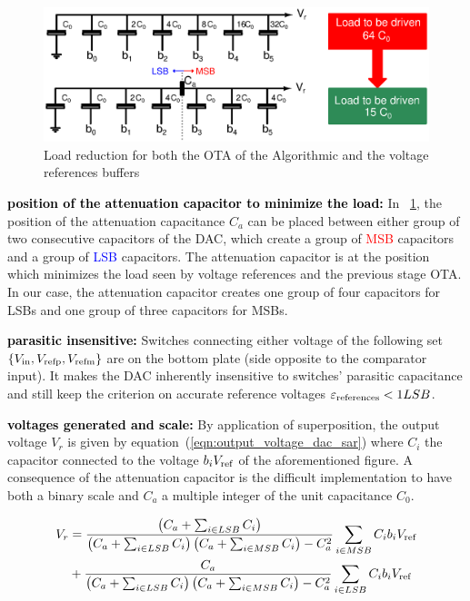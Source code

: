 \begin{figure}[htp]
	\centering
	\includegraphics[width=\textwidth]{Chapter4/Figs/sar-dac-normal-split-cap.ps}
	\caption{Load reduction for both the OTA of the Algorithmic and the voltage references buffers}
	\label{fig:sar-dac-normal-split-cap}
\end{figure}
\textbf{\textcolor{black}{position of the attenuation capacitor to minimize the load:}}
In \figurename~\ref{fig:sar-dac-normal-split-cap}, the position of the attenuation capacitance \(C_a\) can be placed between either group of two consecutive capacitors of the DAC, which create a group of \textcolor{red}{MSB} capacitors and a group of \textcolor{blue}{LSB} capacitors. The attenuation capacitor is at the position which minimizes the load seen by voltage references and the previous stage OTA\@. In our case, the attenuation capacitor creates one group of four capacitors for LSBs and one group of three capacitors for MSBs.

\textbf{\textcolor{black}{parasitic insensitive:}}
Switches connecting either voltage of the following set \(\left\{ V_{\rm in}, V_{\rm refp}, V_{\rm refm} \right\} \) are on the bottom plate (side opposite to the comparator input). It makes the DAC inherently insensitive to switches' parasitic capacitance and still keep the criterion on accurate reference voltages \(\varepsilon_{\rm references} < 1 LSB\).

\textbf{\textcolor{black}{voltages generated and scale:}}
By application of superposition, the output voltage \(V_r\) is given by equation~(\ref{eqn:output_voltage_dac_sar}) where \(C_i\) the capacitor connected to the voltage \(b_i V_{\rm ref}\) of the aforementioned figure. A consequence of the attenuation capacitor is the difficult implementation to have both a binary scale and \(C_a\) a multiple integer of the unit capacitance \(C_0\).

\begin{align}
	\label{eqn:output_voltage_dac_sar}
	V_r &= \frac{\left(C_a + \sum_{i \in LSB}{C_i}\right)}{\left(C_a + \sum_{i \in LSB}{C_i}\right)\left(C_a + \sum_{i \in MSB}{C_i}\right)-C_a^2} \sum_{i \in MSB}{C_i b_i} V_{\rm ref} \nonumber \\
	&+ \frac{C_a}{\left(C_a + \sum_{i \in LSB}{C_i}\right)\left(C_a + \sum_{i \in MSB}{C_i}\right)-C_a^2} \sum_{i \in LSB}{C_i b_i} V_{\rm ref}
\end{align}

